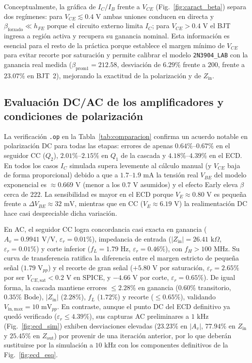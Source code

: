\documentclass[conference]{IEEEtran}
\begin{document}
Conceptualmente, la gr\'afica de $I_C/I_B$ frente a $V_{CE}$ (Fig.~\ref{fig:caract_beta}) separa dos reg\'imenes: para $V_{CE} \lesssim 0.4\text{ V}$ ambas uniones conducen en directa y $\beta_{\mathrm{forzado}} \ll h_{FE}$ porque el circuito externo limita $I_C$; para $V_{CE} > 0.4\text{ V}$ el BJT ingresa a regi\'on activa y recupera su ganancia nominal. Esta informaci\'on es esencial para el resto de la pr\'actica porque establece el margen m\'inimo de $V_{CE}$ para evitar recorte por saturaci\'on y permite calibrar el modelo \texttt{2N3904\_LAB} con la ganancia real medida ($\beta_{\mathrm{prom1}} = 212.58$, desviaci\'on de $6.29\%$ frente a $200$, frente a $23.07\%$ en BJT~2), mejorando la exactitud de la polarizaci\'on y de $Z_{\mathrm{in}}$.

\subsection{Evaluaci\'on DC/AC de los amplificadores y condiciones de polarizaci\'on}

La verificaci\'on \texttt{.op} en la Tabla~\ref{tab:comparacion} confirma un acuerdo notable en polarizaci\'on DC para todas las etapas: errores de apenas $0.64\%$--$0.67\%$ en el seguidor CC ($Q_2$), $2.01\%$--$2.15\%$ en $Q_1$ de la cascada y $4.18\%$--$4.39\%$ en el ECD. En todos los casos $I_C$ simulada supera levemente al c\'alculo manual (y $V_{CE}$ baja de forma proporcional) debido a que a $1.7\text{--}1.9\text{ mA}$ la tensi\'on real $V_{BE}$ del modelo exponencial es $\approx 0.669\text{ V}$ (menor a los $0.7\text{ V}$ asumidos) y el efecto Early eleva $\beta$ cerca de $222$. La sensibilidad es mayor en el ECD porque $V_E \approx 0.80\text{ V}$ es peque\~na frente a $\Delta V_{BE} \approx 32\text{ mV}$, mientras que en CC ($V_E \approx 6.19\text{ V}$) la realimentaci\'on DC hace casi despreciable dicha variaci\'on.

En AC, el seguidor CC logra concordancia casi exacta en ganancia ($A_v = 0.9941\text{ V/V}$, $\varepsilon_r = 0.01\%$), impedancia de entrada ($|Z_{\mathrm{in}}| = 26.41\text{ k}\Omega$, $\varepsilon_r = 0.01\%$) y corte inferior ($f_L = 1.79\text{ Hz}$, $\varepsilon_r = 0.46\%$), con $f_H > 100\text{ MHz}$. Su curva de transferencia ratifica la diferencia entre el margen estricto de peque\~na se\~nal ($1.79\text{ V}_{pp}$) y el recorte de gran se\~nal ($+5.80\text{ V}$ por saturaci\'on, $\varepsilon_r = 2.65\%$ por ser $V_{CE,\mathrm{sat}} < 0.2\text{ V}$ en SPICE, y $-4.66\text{ V}$ por corte, $\varepsilon_r = 0.65\%$). De igual forma, la cascada mantiene errores $\le 2.28\%$ en ganancia ($0.60\%$ transitorio, $0.35\%$ Bode), $|Z_{\mathrm{in}}|$ ($2.28\%$), $f_L$ ($1.72\%$) y recorte ($\le 0.65\%$), validando $V_{\mathrm{in,max}} = 10\text{ mV}_{pp}$. En contraste, aunque el punto DC del ECD definitivo ya qued\'o verificado ($\varepsilon_r \le 4.39\%$), sus capturas AC preliminares a $1\text{ kHz}$ (Fig.~\ref{fig:ecd_sim}) exhiben desviaciones elevadas ($23.23\%$ en $|A_v|$, $77.94\%$ en $Z_{\mathrm{in}}$ y $25.45\%$ en $Z_{\mathrm{out}}$) por provenir de una iteraci\'on anterior, por lo que deber\'an sustituirse por la simulaci\'on a $10\text{ kHz}$ con los componentes definitivos de la Fig.~\ref{fig:ecd_esq}.
\end{document}

